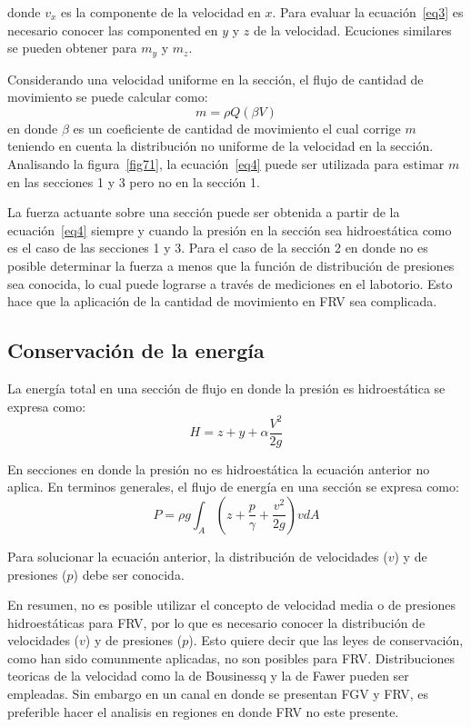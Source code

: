 \documentclass[11pt, oneside]{article}
\begin{document}
donde $v_x$ es la componente de la velocidad en $x$. Para evaluar la ecuaci\'on~\ref{eq3} es necesario conocer las componented en $y$ y $z$ de la velocidad. Ecuciones similares se pueden obtener para $m_y$ y $m_z$.

Considerando una velocidad uniforme en la secci\'on, el flujo de cantidad de movimiento se puede calcular como:
\begin{equation}
    m = \rho Q \left( \beta V \right)
\label{eq4}
\end{equation}
en donde $\beta$ es un coeficiente de cantidad de movimiento el cual corrige $m$ teniendo en cuenta la distribuci\'on no uniforme de la velocidad en la secci\'on. Analisando la figura~\ref{fig71}, la ecuaci\'on~\ref{eq4} puede ser utilizada para estimar $m$ en las secciones 1 y 3 pero no en la secci\'on 1. 

La fuerza actuante sobre una secci\'on puede ser obtenida a partir de la ecuaci\'on~\ref{eq4} siempre y cuando la presi\'on en la secci\'on sea hidroest\'atica como es el caso de las secciones 1 y 3. Para el caso de la secci\'on 2 en donde no es posible determinar la fuerza  a menos que la funci\'on de distribuci\'on de presiones sea conocida, lo cual puede lograrse a trav\'es de mediciones en el labotorio.  Esto hace que la aplicaci\'on de la cantidad de movimiento en FRV sea complicada. 


\subsection{Conservaci\'on de la energ\'ia}
La energ\'ia total en una secci\'on de flujo en donde la presi\'on es hidroest\'atica se expresa como:
\begin{equation}
    H = z + y + \alpha \frac{V^2}{2g}
\label{eq5}
\end{equation}

En secciones en donde la presi\'on no es hidroest\'atica la ecuaci\'on anterior no aplica. En terminos generales, el flujo de energ\'ia en una secci\'on se expresa como:
\begin{equation}
    P = \rho g \int_A \left( z + \frac{p}{\gamma} + \frac{v^2}{2g} \right) v dA
\label{eq6}
\end{equation}

Para solucionar la ecuaci\'on anterior, la distribuci\'on de velocidades ($v$) y de presiones ($p$) debe ser conocida.

En resumen, no es posible utilizar el concepto de velocidad media o de presiones hidroest\'aticas para FRV, por lo que es necesario conocer la distribuci\'on de velocidades ($v$) y de presiones ($p$). Esto quiere decir que las leyes de conservaci\'on, como han sido comunmente aplicadas, no son posibles para FRV. Distribuciones teoricas de la velocidad como la de Bousinessq y la de Fawer pueden ser empleadas. Sin embargo en un canal en donde se presentan FGV y FRV, es preferible hacer el analisis en regiones en donde FRV no este presente. 
\end{document}
